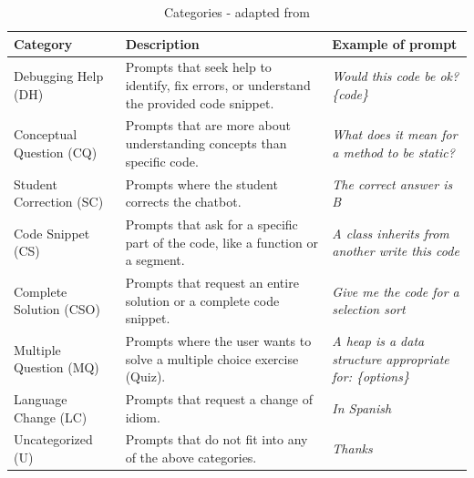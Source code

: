 \documentclass[a4paper,twoside]{article}
\begin{document}
\begin{table}[htbp]
  \caption{Categories - adapted from \cite{Ghimire24}}
  \begin{center}
    \renewcommand{\arraystretch}{1} %
    \begin{tabular}{p{3.8cm} p{6cm} p{4.5cm}} %
      \hline
      \textbf{Category} & \textbf{Description} & \textbf{Example of prompt} \\
      \hline
      Debugging Help (DH) & Prompts that seek help to identify, fix errors, or understand the provided code snippet. & \textit{Would this code be ok? \{code\}} \\
      Conceptual Question (CQ) & Prompts that are more about understanding concepts than specific code. & \textit{What does it mean for a method to be static?} \\
      Student Correction (SC) & Prompts where the student corrects the chatbot. & \textit{The correct answer is B} \\
      Code Snippet  (CS) & Prompts that ask for a specific part of the code, like a function or a segment. & \textit{A class inherits from another write this code} \\
      Complete Solution (CSO) & Prompts that request an entire solution or a complete code snippet. & \textit{Give me the code for a selection sort} \\
      Multiple Question (MQ) & Prompts where the user wants to solve a multiple choice exercise (Quiz). & \textit{A heap is a data structure appropriate for: \{options\}} \\
      Language Change (LC) & Prompts that request a change of idiom. & \textit{In Spanish} \\
      Uncategorized (U) & Prompts that do not fit into any of the above categories. & \textit{Thanks} \\
      \hline
    \end{tabular}
    \label{tab:categories}
  \end{center}
\end{table}


\end{document}
